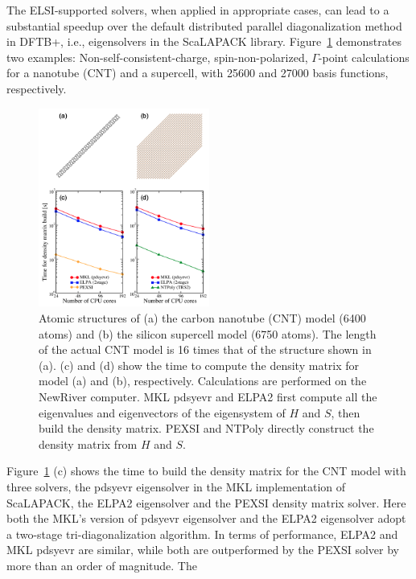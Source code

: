 \documentclass[reprint,onecolumn,superscriptaddress]{revtex4-1}
\newcommand{\dftbp}{DFTB+}
\begin{document}
The ELSI-supported solvers, when applied in appropriate cases, can lead to a substantial
speedup over the default distributed parallel diagonalization method in \dftbp{}, i.e.,
eigensolvers in the ScaLAPACK
library.\cite{scalapack_blackford_1997,dc_tisseur_1999,mrrr_vomel_2010}
Figure~\ref{fig:solvers} demonstrates two examples: Non-self-consistent-charge,
spin-non-polarized, $\Gamma$-point calculations for a  nanotube (CNT)
and a  supercell, with 25600 and 27000 basis functions, respectively.
\begin{figure}[htbp]
  \centering
  \includegraphics[width=0.5\textwidth]{figures/solvers.png}
  \caption{Atomic structures of (a) the carbon nanotube (CNT) model (6400
    atoms) and (b) the silicon supercell model (6750 atoms). The length of the
    actual CNT model is 16 times that of the structure shown in (a). (c) and (d)
    show the time to compute the density matrix for model (a) and (b),
    respectively. Calculations are performed on the NewRiver computer. MKL
    pdsyevr and ELPA2 first compute all the eigenvalues and eigenvectors of the
    eigensystem of $H$ and $S$, then build the density matrix. PEXSI and NTPoly
    directly construct the density matrix from $H$ and $S$.}
  \label{fig:solvers}
\end{figure}
Figure~\ref{fig:solvers} (c) shows the time to build the density matrix for the
CNT model with three solvers, the pdsyevr eigensolver in the MKL implementation
of ScaLAPACK, the ELPA2 eigensolver and the PEXSI density matrix solver. Here
both the MKL's version of pdsyevr eigensolver and the ELPA2 eigensolver adopt a
two-stage tri-diagonalization
algorithm.\cite{2stage_bischof_1994,elpa_marek_2014,mkl_arturov_2018} In terms
of performance, ELPA2 and MKL pdsyevr are similar, while both are outperformed
by the PEXSI solver by more than an order of magnitude. The
\end{document}
